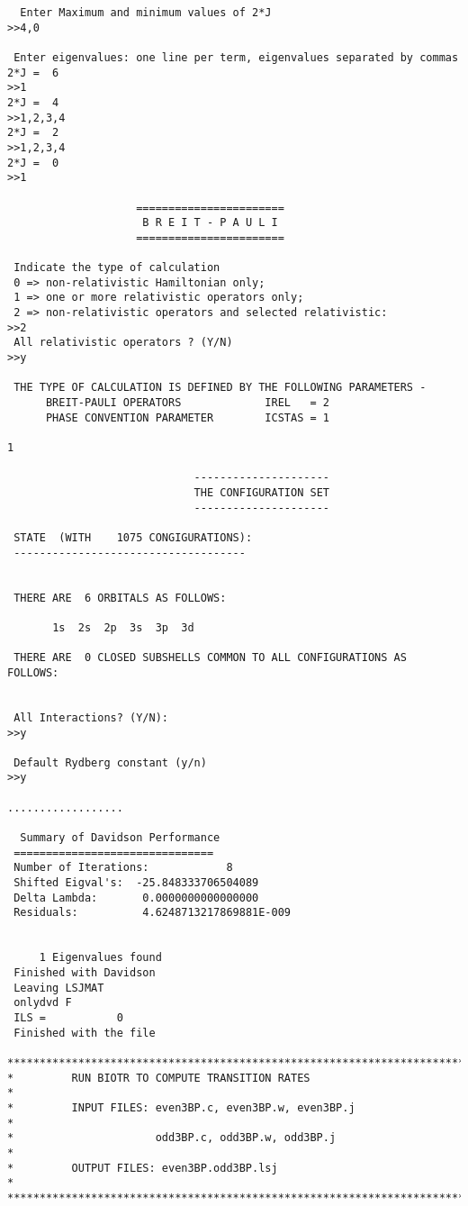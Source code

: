 \documentclass[fleqn,10pt]{book}
\begin{document}
\begin{verbatim}
  Enter Maximum and minimum values of 2*J
>>4,0

 Enter eigenvalues: one line per term, eigenvalues separated by commas
2*J =  6
>>1
2*J =  4
>>1,2,3,4
2*J =  2
>>1,2,3,4
2*J =  0
>>1

                    =======================
                     B R E I T - P A U L I 
                    =======================

 Indicate the type of calculation 
 0 => non-relativistic Hamiltonian only;
 1 => one or more relativistic operators only;
 2 => non-relativistic operators and selected relativistic:  
>>2
 All relativistic operators ? (Y/N) 
>>y

 THE TYPE OF CALCULATION IS DEFINED BY THE FOLLOWING PARAMETERS - 
      BREIT-PAULI OPERATORS             IREL   = 2
      PHASE CONVENTION PARAMETER        ICSTAS = 1

1

                             ---------------------
                             THE CONFIGURATION SET
                             ---------------------

 STATE  (WITH    1075 CONGIGURATIONS):
 ------------------------------------


 THERE ARE  6 ORBITALS AS FOLLOWS:

       1s  2s  2p  3s  3p  3d

 THERE ARE  0 CLOSED SUBSHELLS COMMON TO ALL CONFIGURATIONS AS FOLLOWS:


 All Interactions? (Y/N): 
>>y

 Default Rydberg constant (y/n)
>>y

..................
 
  Summary of Davidson Performance
 ===============================
 Number of Iterations:            8
 Shifted Eigval's:  -25.848333706504089     
 Delta Lambda:       0.0000000000000000     
 Residuals:          4.6248713217869881E-009


     1 Eigenvalues found
 Finished with Davidson
 Leaving LSJMAT
 onlydvd F
 ILS =           0
 Finished with the file
 
*******************************************************************************
*         RUN BIOTR TO COMPUTE TRANSITION RATES                               *
*         INPUT FILES: even3BP.c, even3BP.w, even3BP.j                        *
*                      odd3BP.c, odd3BP.w, odd3BP.j                           *
*         OUTPUT FILES: even3BP.odd3BP.lsj                                    *
******************************************************************************* 
 

\end{verbatim}
\end{document}
